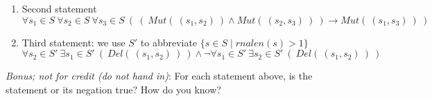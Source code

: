 \begin{enumerate}
\begin{enumerate}
 \item Second statement
 \[
 \forall s_1 \in S ~ \forall s_2 \in S ~\forall s_3 \in S ~\left( ~\left(~Mut(~(s_1,s_2)~) \land Mut(~(s_2, s_3)~) ~\right) \to Mut(~(s_1,s_3)~)~\right)
 \]
 
 \item Third statement: we use $S'$ to abbreviate $\{ s\in S \mid rnalen(s) > 1\}$
 \[
 \forall s_2 \in S' ~\exists s_1 \in S'~\left(~ Del(~(s_1,s_2)~)~\right) 
 \land \lnot \forall s_1 \in S' ~\exists s_2 \in S'~\left(~ Del(~(s_1,s_2)~)~\right) 
 \]
 \end{enumerate}

 {\it Bonus; not for credit (do not hand in)}:  For each statement above, is the statement or its negation true? How do you know?
 
 
\end{enumerate}

